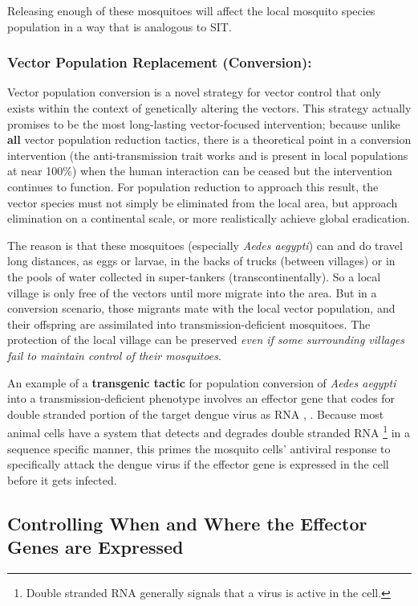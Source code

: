 Releasing enough of these mosquitoes will affect the local mosquito species population in a way that is analogous to \gls{SIT}.

\subsubsection{Vector Population Replacement (Conversion):}

Vector population conversion is a novel strategy for vector control that only exists within the context of genetically altering the vectors.
This strategy actually promises to be the most long-lasting vector-focused intervention; because unlike \textbf{all} vector population reduction tactics, there is a theoretical point in a conversion intervention (the anti-transmission trait works and is present in local populations at near 100\%) when the human interaction can be ceased but the intervention continues to function.
For population reduction to approach this result, the vector species must not simply be eliminated from the local area, but approach elimination on a continental scale, or more realistically achieve global eradication.

The reason is that these mosquitoes (especially \emph{Aedes aegypti}) can and do travel long distances, as eggs or larvae, in the backs of trucks (between villages) or in the pools of water collected in super-tankers (transcontinentally).
So a local village is only free of the vectors until more migrate into the area.
But in a conversion scenario, those migrants mate with the local vector population, and their offspring are assimilated into transmission-deficient mosquitoes.
The protection of the local village can be preserved \emph{even if some surrounding villages fail to maintain control of their mosquitoes}.

An example of a \textbf{transgenic tactic} for population conversion of \emph{Aedes aegypti} into a transmission-deficient phenotype involves an effector gene that codes for double stranded portion of the target dengue virus as RNA \cite{Franz2006}, \cite{Mathur2010}.
Because most animal cells have a system that detects and degrades double stranded RNA
\footnote{Double stranded RNA generally signals that a virus is active in the cell.}
in a sequence specific manner, this primes the mosquito cells' antiviral response to specifically attack the dengue virus if the effector gene is expressed in the cell before it gets infected.

\subsection{Controlling When and Where the Effector Genes are Expressed}


